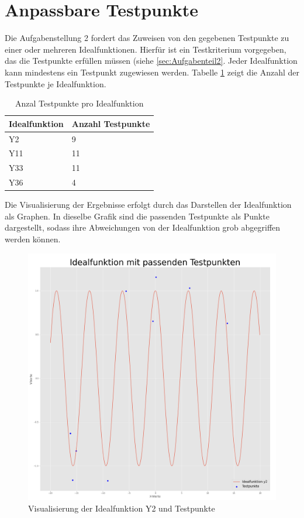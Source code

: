 \documentclass[11pt,a4paper]{scrreprt}
\begin{document}
\section{Anpassbare Testpunkte}
Die Aufgabenstellung 2 fordert das Zuweisen von den gegebenen Testpunkte zu einer oder mehreren Idealfunktionen. Hierfür ist ein Testkriterium vorgegeben, das die Testpunkte erfüllen müssen (siehe \ref{sec:Aufgabenteil2}. Jeder Idealfunktion kann mindestens ein Testpunkt zugewiesen werden. Tabelle \ref{tab:Testpunkte} zeigt die Anzahl der Testpunkte je Idealfunktion. 

\begin{table}[!h]
\centering
\begin{tabularx}{0.5\textwidth}{|l|X|}
\hline
\textbf{Idealfunktion} & \textbf{Anzahl Testpunkte}\\
\hline
Y2 & 9\\
\hline
Y11 & 11\\
\hline
Y33 & 11\\
\hline
Y36 & 4\\
\hline
\end{tabularx}
\caption{Anzal Testpunkte pro Idealfunktion}
\label{tab:Testpunkte}
\end{table}

Die Visualisierung der Ergebnisse erfolgt durch das Darstellen der Idealfunktion als Graphen. In dieselbe Grafik sind die passenden Testpunkte als Punkte dargestellt, sodass ihre Abweichungen von der Idealfunktion grob abgegriffen werden können.

\begin{figure}[!h]
	\centering
	\includegraphics[scale=0.25]			  {Idealfuntionfunktion_y2_Testpunkte}
	\caption{Visualisierung der Idealfunktion Y2 und Testpunkte}
	\label{fig:Ideal2}
\end{figure}
\end{document}
